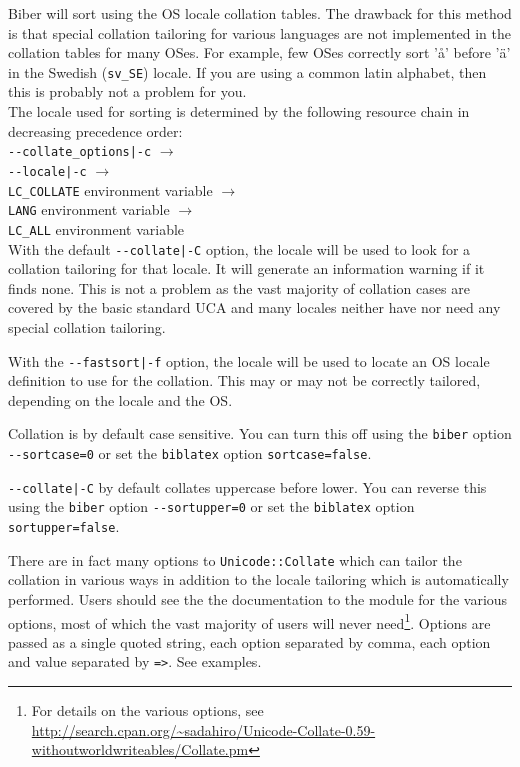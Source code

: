 \documentclass{ltxdockit}
\def\biberex#1{\hbox{\hspace{-4em}\texttt{\small \detokenize{#1}}}}
\begin{document}
\biberex{--fastsort|-f} Biber will sort using
  the OS locale collation tables. The drawback for this method is that special
  collation tailoring for various languages are not implemented in the
  collation tables for many OSes. For example, few OSes correctly sort 'å'
  before 'ä' in the Swedish (\verb+sv_SE+) locale. If you are using a
  common latin alphabet, then this is probably not a problem for you.\\[2ex]

\noindent The locale used for sorting is determined by the following resource
chain in decreasing precedence order:\\[2ex]

\noindent\verb+--collate_options|-c+ $\rightarrow$\\
\hspace*{1em}\verb+--locale|-c+ $\rightarrow$\\
\hspace*{2em}\verb+LC_COLLATE+ environment variable $\rightarrow$\\
\hspace*{3em}\verb+LANG+ environment variable $\rightarrow$\\
\hspace*{4em}\verb+LC_ALL+ environment variable\\[2ex]

\noindent With the default \verb+--collate|-C+ option, the locale will
be used to look for a collation tailoring for that locale. It will generate an
information warning if it finds none. This is not a problem as the vast
majority of collation cases are covered by the basic standard UCA and many
locales neither have nor need any special collation tailoring.

\noindent With the \verb+--fastsort|-f+ option, the locale will be
used to locate an OS locale definition to use for the collation. This
may or may not be correctly tailored, depending on the locale and the OS.

\noindent Collation is by default case sensitive. You can turn this
off using the \verb+biber+ option \verb+--sortcase=0+ or set the
\verb+biblatex+ option \verb+sortcase=false+.

\noindent \verb+--collate|-C+ by default collates uppercase before
lower. You can reverse this using the \verb+biber+ option \verb+--sortupper=0+
or set the \verb+biblatex+ option \verb+sortupper=false+.

\noindent There are in fact many options to \verb+Unicode::Collate+
which can tailor the collation in various ways in
addition to the locale tailoring which is automatically performed.
Users should see the the documentation to the module for the various
options, most of which the vast majority of users will never
need\footnote{For details on the various options, see
  \url{http://search.cpan.org/~sadahiro/Unicode-Collate-0.59-withoutworldwriteables/Collate.pm}}.
Options are passed as a single quoted string, each option separated by
comma, each option and value separated by \verb+=>+. See examples.
\end{document}
